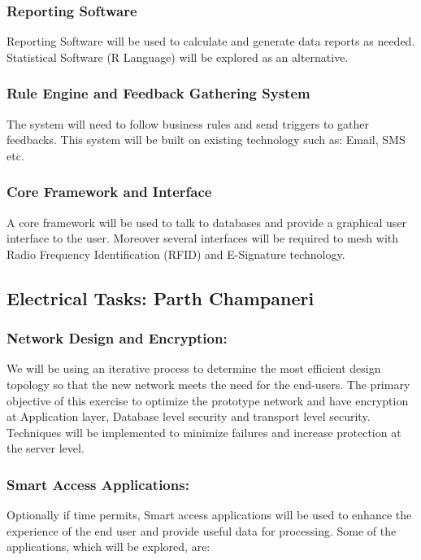 \documentclass{journal}
\begin{document}
\subsubsection{Reporting Software}

Reporting Software will be used to calculate and generate data reports as needed. Statistical Software (R Language) will be explored as an alternative.

\subsubsection{Rule Engine and Feedback Gathering System}

The system will need to follow business rules and send triggers to gather feedbacks. This system will be built on existing technology such as: Email, SMS etc. 

\subsubsection{Core Framework and Interface}

A core framework will be used to talk to databases and provide a graphical user interface to the user. Moreover several interfaces will be required to mesh with Radio Frequency Identification (RFID) and E-Signature technology. 

\subsection{ Electrical Tasks: Parth Champaneri }

\subsubsection{Network Design and Encryption:}

We will be using an iterative process to determine the most efficient design topology so that the new network meets the need for the end-users. The primary objective of this exercise to optimize the prototype network and have encryption at Application layer, Database level security and transport level security. Techniques will be implemented to minimize failures and increase protection at the server level. 

\subsubsection{Smart Access Applications:} Optionally if time permits, Smart access applications will be used to enhance the experience of the end user and provide useful data for processing. Some of the applications, which will be explored, are:
\end{document}
